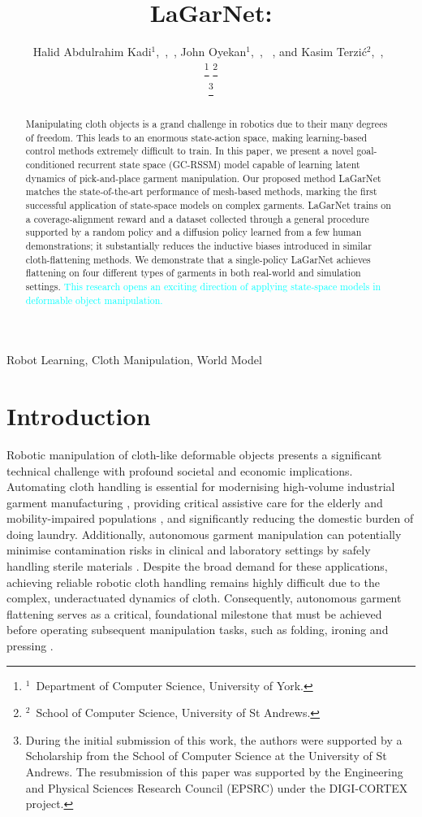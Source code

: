 \documentclass[journal]{IEEEtran}
\title{LaGarNet: \addIncrementalg{Human-Level Pick-and-Place Garment Flattening with Goal-Conditioned Recurrent State-Space Models}}
\author{
Halid Abdulrahim Kadi$^{1}$,~\IEEEmembership{Member,~IEEE},~\orcidlink{0000-0001-9290-467X},
John Oyekan$^{1}$,~\IEEEmembership{Member,~IEEE},~\orcidlink{0000-0001-6578-9928}
, and
Kasim Terzi{\'c}$^{2}$,~\IEEEmembership{Member,~IEEE},~\orcidlink{0000-0001-6692-209X}

\thanks{$^{1}$~Department of Computer Science, University of York.}
\thanks{$^{2}$~School of Computer Science, University of St Andrews.}

\thanks{During the initial submission of this work, the authors were supported by a Scholarship from the School of Computer Science at the University of St Andrews. The resubmission of this paper was supported by the Engineering and Physical Sciences Research Council (EPSRC) under the DIGI-CORTEX project.}
}
\newcommand{\addIncremental}[1]{\textcolor{cyan}{#1}}
\newcommand{\addIncrementalg}[1]{\textcolor{mygreen}{#1}}
\begin{document}
\maketitle

\begin{abstract} \addIncrementalg{Manipulating cloth objects is a grand challenge in robotics due to their many degrees of freedom. This leads to an enormous state-action space, making learning-based control methods extremely difficult to train. In this paper,} we present a novel goal-conditioned recurrent state space (GC-RSSM) model capable of learning latent dynamics of pick-and-place garment manipulation. Our proposed method LaGarNet matches the state-of-the-art performance of mesh-based methods, marking the first successful application of state-space models on complex garments. LaGarNet trains on a coverage-alignment reward and a dataset collected through a general procedure supported by a random policy and a diffusion policy learned from a few human demonstrations; it substantially reduces the inductive biases introduced in similar cloth-flattening methods. We demonstrate that a single-policy LaGarNet achieves flattening on four different types of garments in both real-world and simulation settings. \addIncremental{This research opens an exciting direction of applying state-space models in deformable object manipulation.}
\end{abstract}

\begin{IEEEkeywords}
Robot Learning, Cloth Manipulation, World Model
\end{IEEEkeywords}


\section{Introduction} \label{sec:introduction}

\addIncrementalg{Robotic manipulation of cloth-like deformable objects presents a significant technical challenge with profound societal and economic implications. Automating cloth handling is essential for modernising high-volume industrial garment manufacturing \cite{nayak2018introduction}, providing critical assistive care for the elderly and mobility-impaired populations \cite{WTOaged2024, disablity2011world}, and significantly reducing the domestic burden of doing laundry. Additionally, autonomous garment manipulation can potentially minimise contamination risks in clinical and laboratory settings by safely handling sterile materials \cite{cornish2021clinical}. Despite the broad demand for these applications, achieving reliable robotic cloth handling remains highly difficult due to the complex, underactuated dynamics of cloth. Consequently, autonomous garment flattening serves as a critical, foundational milestone that must be achieved before operating subsequent manipulation tasks, such as folding, ironing and pressing \cite{doumanoglou2016folding}.}
\end{document}
